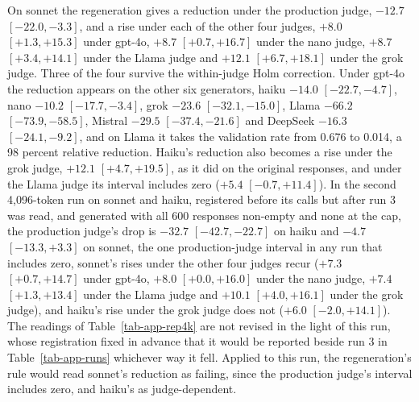 On sonnet the regeneration gives a reduction under the production judge,
$-12.7$ $[-22.0, -3.3]$, and a rise under each of the other four judges,
$+8.0$ $[+1.3, +15.3]$ under gpt-4o, $+8.7$ $[+0.7, +16.7]$
under the nano judge, $+8.7$ $[+3.4, +14.1]$ under the Llama judge and $+12.1$
$[+6.7, +18.1]$ under the grok judge. Three of the four survive the
within-judge Holm correction.
Under gpt-4o the reduction appears on the other six generators, haiku $-14.0$
$[-22.7, -4.7]$, nano $-10.2$ $[-17.7, -3.4]$, grok $-23.6$ $[-32.1, -15.0]$,
Llama $-66.2$ $[-73.9, -58.5]$, Mistral $-29.5$ $[-37.4, -21.6]$ and DeepSeek
$-16.3$ $[-24.1, -9.2]$, and on Llama it takes the validation rate from 0.676
to 0.014, a 98 percent relative reduction.
Haiku's reduction also becomes a rise under the grok judge, $+12.1$
$[+4.7, +19.5]$, as it did on the original responses, and under the Llama judge
its interval includes zero ($+5.4$ $[-0.7, +11.4]$).
In the second 4,096-token run on sonnet and haiku, registered before its
calls but after run 3 was read, and generated with all 600 responses
non-empty and none at the cap, the production judge's drop is
$-32.7$ $[-42.7, -22.7]$ on haiku and $-4.7$ $[-13.3, +3.3]$ on sonnet, the
one production-judge interval in any run that includes zero, sonnet's rises
under the other four judges recur ($+7.3$ $[+0.7, +14.7]$ under gpt-4o,
$+8.0$ $[+0.0, +16.0]$ under the nano judge, $+7.4$ $[+1.3, +13.4]$ under the Llama
judge and $+10.1$ $[+4.0, +16.1]$ under the grok judge), and haiku's rise
under the grok judge does not ($+6.0$ $[-2.0, +14.1]$). The readings of
Table~\ref{tab-app-rep4k} are not revised in the light of this run, whose
registration fixed in advance that it would be reported beside run 3 in
Table~\ref{tab-app-runs} whichever way it fell. Applied to this run, the
regeneration's rule would read sonnet's reduction as failing, since the
production judge's interval includes zero, and haiku's as judge-dependent.
